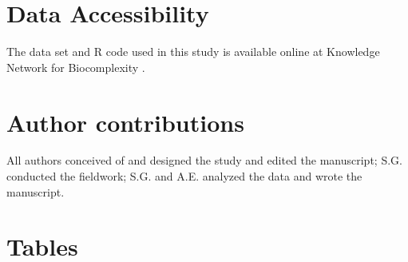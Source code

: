 \documentclass{article}
\begin{document}
\section*{Data Accessibility}
The data set and R code used in this study is available online at Knowledge Network for Biocomplexity \citep{gee2017}. 

\section*{Author contributions} All authors conceived of and designed the study and edited the manuscript; S.G. conducted the fieldwork; S.G. and A.E. analyzed the data and wrote the manuscript.



\section* {Tables}
\end{document}
